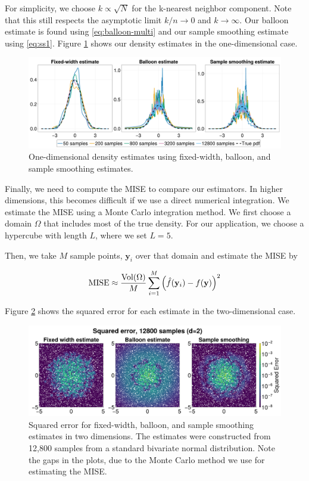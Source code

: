 \documentclass{article}
\begin{document}
For simplicity, we choose $k \propto \sqrt{N}$ for the k-nearest neighbor component. Note that this still respects the asymptotic limit $k/n \rightarrow 0$ and $k\rightarrow \infty$. Our balloon estimate is found using \eqref{eq:balloon-multi} and our sample smoothing estimate using \eqref{eq:ss1}. Figure \ref{fig:1d-visual} shows our density estimates in the one-dimensional case. 

\begin{figure}
    \centering
    \includegraphics[width=\linewidth]{images/1D_visual.png}
    \caption{One-dimensional density estimates using fixed-width, balloon, and sample smoothing estimates.}
    \label{fig:1d-visual}
\end{figure}

Finally, we need to compute the MISE to compare our estimators. In higher dimensions, this becomes difficult if we use a direct numerical integration. We estimate the MISE using a Monte Carlo integration method. We first choose a domain $\Omega$ that includes most of the true density. For our application, we choose a hypercube with length $L$, where we set $L=5$.

Then, we take $M$ sample points, $\mathbf{y}_i$ over that domain and estimate the MISE by 

\begin{equation}\label{eq:monte-carlo-MISE}
    \textup{MISE} \approx \frac{\textup{Vol}(\Omega)}{M}\sum_{i=1}^M \left(\hat{f}(\mathbf{y}_i) - f(\mathbf{y})\right)^2
\end{equation}

Figure \ref{fig:2d-visual} shows the squared error for each estimate in the two-dimensional case.

\begin{figure}
    \centering
    \includegraphics[width=\linewidth]{images/2D_visual.png}
    \caption{Squared error for fixed-width, balloon, and sample smoothing estimates in two dimensions. The estimates were constructed from 12,800 samples from a standard bivariate normal distribution. Note the gaps in the plots, due to the Monte Carlo method we use for estimating the MISE.}
    \label{fig:2d-visual}
\end{figure}
\end{document}
